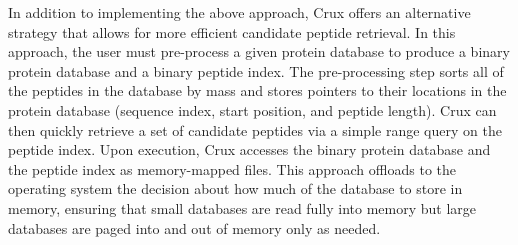\documentclass[12pt]{article}
\begin{document}
In addition to implementing the above approach, Crux offers an
alternative strategy that allows for more efficient candidate peptide
retrieval.  In this approach, the user must pre-process a given
protein database to produce a binary protein database and a binary
peptide index.  The pre-processing step sorts all of the peptides in
the database by mass and stores pointers to their locations in the
protein database (sequence index, start position, and peptide length).
Crux can then quickly retrieve a set of candidate peptides via a
simple range query on the peptide index.  Upon execution, Crux
accesses the binary protein database and the peptide index as
memory-mapped files.  This approach offloads to the operating system
the decision about how much of the database to store in memory,
ensuring that small databases are read fully into memory but large
databases are paged into and out of memory only as needed.
\end{document}
